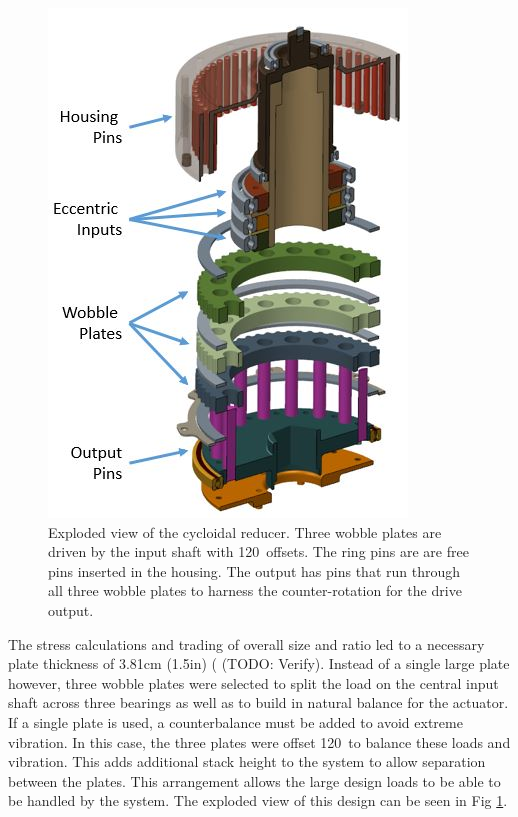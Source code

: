 \documentclass[letterpaper, 10 pt, conference]{ieeeconf}  %
\begin{document}
   \begin{figure}[!b]
      \centering
      \includegraphics[width=0.75\linewidth]{exploded_labeled}
      \caption{Exploded view of the cycloidal reducer. Three wobble plates are driven by the input shaft with 120\textdegree\ offsets. The ring pins are are free pins inserted in the housing. The output has pins that run through all three wobble plates to harness the counter-rotation for the drive output.}
      \label{cycloid_exploded}
   \end{figure}
   
The stress calculations and trading of overall size and ratio led to a necessary plate thickness of 3.81cm (1.5in) ( (TODO: Verify). Instead of a single large plate however, three wobble plates were selected to split the load on the central input shaft across three bearings as well as to build in natural balance for the actuator. If a single plate is used, a counterbalance must be added to avoid extreme vibration. In this case, the three plates were offset 120\textdegree\ to balance these loads and vibration. This adds additional stack height to the system to allow separation between the plates. This arrangement allows the large design loads to be able to be handled by the system. The exploded view of this design can be seen in Fig \ref{cycloid_exploded}. 
\end{document}
